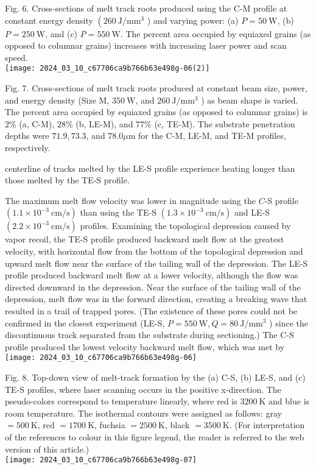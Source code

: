 \documentclass[10pt]{article}
\begin{document}
Fig. 6. Cross-sections of melt track roots produced using the C-M profile at constant energy density $\left(260 \mathrm{~J} / \mathrm{mm}^{3}\right.$ ) and varying power: (a) $P=50 \mathrm{~W}$, (b) $P=250 \mathrm{~W}$, and (c) $P=550 \mathrm{~W}$. The percent area occupied by equiaxed grains (as opposed to columnar grains) increases with increasing laser power and scan speed.\\
\texttt{[image: 2024\_03\_10\_c67706ca9b766b63e498g-06(2)]}

Fig. 7. Cross-sections of melt track roots produced at constant beam size, power, and energy density (Size M, $350 \mathrm{~W}$, and $260 \mathrm{~J} / \mathrm{mm}^{3}$ ) as beam shape is varied. The percent area occupied by equiaxed grains (as opposed to columnar grains) is $2 \%$ (a, C-M), $28 \%$ (b, LE-M), and $77 \%$ (c, TE-M). The substrate penetration depths were $71.9,73.3$, and $78.0 \mu \mathrm{m}$ for the C-M, LE-M, and TE-M profiles, respectively.

centerline of tracks melted by the LE-S profile experience heating longer than those melted by the TE-S profile.

The maximum melt flow velocity was lower in magnitude using the $C$-S profile $\left(1.1 \times 10^{-3} \mathrm{~cm} / \mathrm{s}\right)$ than using the TE-S $\left(1.3 \times 10^{-3} \mathrm{~cm} / \mathrm{s}\right)$ and LE-S $\left(2.2 \times 10^{-3} \mathrm{~cm} / \mathrm{s}\right)$ profiles. Examining the topological depression caused by vapor recoil, the TE-S profile produced backward melt flow at the greatest velocity, with horizontal flow from the bottom of the topological depression and upward melt flow near the surface of the tailing wall of the depression. The LE-S profile produced backward melt flow at a lower velocity, although the flow was directed downward in the depression. Near the surface of the tailing wall of the depression, melt flow was in the forward direction, creating a breaking wave that resulted in a trail of trapped pores. (The existence of these pores could not be confirmed in the closest experiment (LE-S, $P=550 \mathrm{~W}, Q=80 \mathrm{~J} / \mathrm{mm}^{3}$ ) since the discontinuous track separated from the substrate during sectioning.) The C-S profile produced the lowest velocity backward melt flow, which was met by\\
\texttt{[image: 2024\_03\_10\_c67706ca9b766b63e498g-06]}

Fig. 8. Top-down view of melt-track formation by the (a) C-S, (b) LE-S, and (c) TE-S profiles, where laser scanning occurs in the positive x-direction. The pseudo-colors correspond to temperature linearly, where red is $3200 \mathrm{~K}$ and blue is room temperature. The isothermal contours were assigned as follows: gray $=500 \mathrm{~K}$, red $=1700 \mathrm{~K}$, fuchsia $=2500 \mathrm{~K}$, black $=3500 \mathrm{~K}$. (For interpretation of the references to colour in this figure legend, the reader is referred to the web version of this article.)\\
\texttt{[image: 2024\_03\_10\_c67706ca9b766b63e498g-07]}
\end{document}
